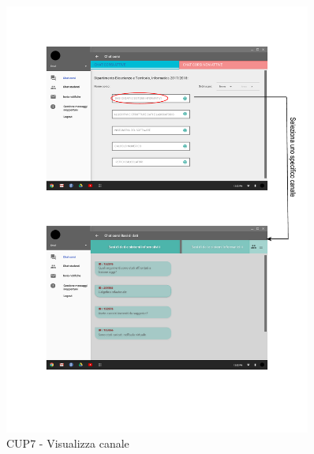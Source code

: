 \begin{figure}
	\centering
	\includegraphics[width=0.9\textwidth]{imgs/gruppo6/activities/act_cup7_visualizza_canale.pdf}
	\caption{CUP7 - Visualizza canale}
	\label{fig:cup7}
\end{figure}


